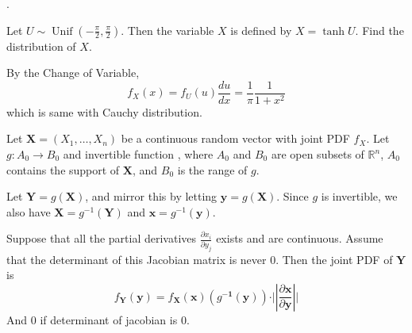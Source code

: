 \documentclass[8pt]{beamer}
\newcommand{\mbb}[1]{\mathbb{#1}}
\newcommand{\mb}[1]{\mathbf{#1}}
\newcommand{\Unif}[2]{\operatorname{Unif}\!\left(#1, #2\right)}
\newcommand{\abs}[1]{\left\lvert #1 \right\rvert}
\begin{document}
\begin{frame}{.}
    \begin{example}[Lighthouse]
        Let $U \sim \Unif{-\frac{\pi}{2}}{\frac{\pi}{2}}$. Then the variable $X$ is defined by $X = \tanh{U}$. Find the distribution of $X$.

        By the Change of Variable, \[f_X(x) = f_U(u) \frac{du}{dx} = \frac{1}{\pi} \frac{1}{1+ x^2}\] which is same with Cauchy distribution.
    \end{example}

    \begin{theorem}
        Let $\mb{X} = (X_1, \dots ,X_n)$ be a continuous random vector with joint PDF $f_X$. Let $g: A_0 \to B_0$ and invertible function , where $A_0$ and $B_0$ are open subsets of $\mbb{R}^n$, $A_0$ contains the support of $\mb{X}$, and $B_0$ is the range of $g$.

        Let $\mb{Y} = g(\mb{X})$, and mirror this by letting $\mb{y} = g(\mb{X})$. Since $g$ is invertible, we also have $\mb{X} = g^{-1}(\mb{Y})$ and $\mb{x} = g^{-1}(\mb{y})$.

        Suppose that all the partial derivatives $\frac{\partial x_i}{\partial y_j}$ exists and are continuous. Assume that the determinant of this Jacobian matrix is never $0$. Then the joint PDF of $\mb{Y}$ is 
        \[
            f_{\mb{Y}}(\mb{y}) = f_{\mb{X}}(\mb{x}) (g^{\mb{-1}}(\mb{y})) \cdot \vert \abs{\frac{\partial \mb{x}}{\partial \mb{y}}} \vert
        \]
        And $0$ if determinant of jacobian is $0$.
    \end{theorem}
\end{frame}
\end{document}
